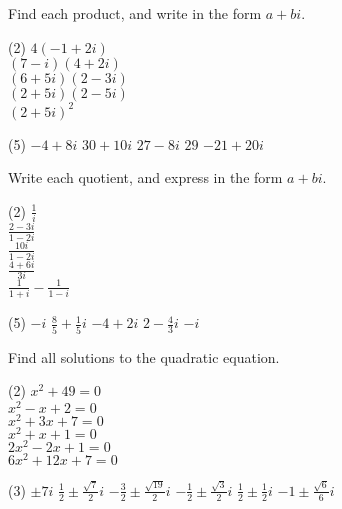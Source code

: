 \documentclass[12pt,fleqn]{book}
\newcommand{\prb}[1]{\begin{Exercise}#1\end{Exercise}}
\newcommand{\sol}[1]{\begin{Answer}#1\end{Answer}}
\begin{document}
\prb{Find each product, and write in the form $a+bi$.
	\begin{tasks}(2)
		\task $4(-1+2 i)$ \\[4em]
		\task $(7-i)(4+2 i)$ \\[4em]
		\task $(6+5 i)(2-3 i)$ \\[4em]
		\task $(2+5 i)(2-5 i)$ \\[4em]
		\task $(2+5 i)^2$ \\[4em]
	\end{tasks}
}

\sol{
	\begin{tasks}(5)
		\task $-4+8 i $
		\task $30+10 i$
		\task $27-8 i $
		\task $29 $
		\task $-21+20 i $
	\end{tasks}
}


\prb{Write each quotient, and express in the form $a+bi$.
	\begin{tasks}(2)
		\task $\displaystyle \frac{1}{i}$ \\[5em]
		\task $\displaystyle \frac{2-3 i}{1-2 i}$ \\[5em]
		\task $\displaystyle \frac{10 i}{1-2 i}$ \\[5em]
		\task $\displaystyle \frac{4+6 i}{3 i}$ \\[5em]
		\task $\displaystyle \frac{1}{1+i}-\frac{1}{1-i}$ \\[5em]
	\end{tasks}
}

\sol{
	\begin{tasks}(5)
		\task $-i $
		\task $\frac{8}{5}+\frac{1}{5} i$
		\task $-4+2 i$
		\task $2-\frac{4}{3} i$
		\task $-i$
	\end{tasks}
}




\prb{Find all solutions to the quadratic equation.
	\begin{tasks}(2)
		\task $x^2+49=0$ \\[8em]
		\task $x^2-x+2=0$ \\[8em]
		\task $x^2+3 x+7=0$ \\[8em]
		\task $x^2+x+1=0$ \\[8em]
		\task $2 x^2-2 x+1=0$ \\[8em]
		\task $6 x^2+12 x+7=0$ \\[8em]
	\end{tasks}
}

\sol{
	\begin{tasks}(3)
		\task $\displaystyle \pm 7 i$
		\task $\displaystyle \frac{1}{2} \pm \frac{\sqrt{7}}{2} i $
		\task $\displaystyle -\frac{3}{2} \pm \frac{\sqrt{19}}{2} i$
		\task $\displaystyle -\frac{1}{2} \pm \frac{\sqrt{3}}{2} i $
		\task $\displaystyle \frac{1}{2} \pm \frac{1}{2} i $
		\task $\displaystyle -1 \pm \frac{\sqrt{6}}{6} i$
	\end{tasks}
}
\end{document}
